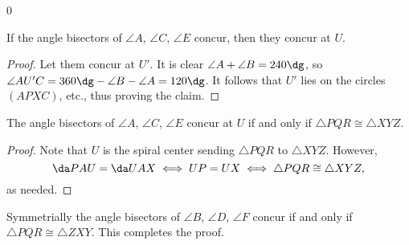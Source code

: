 \setcounter{claim}0
\begin{claim}
    If the angle bisectors of $\angle A$, $\angle C$, $\angle E$ concur, then they concur at $U$.
\end{claim}
\begin{proof}
    Let them concur at $U'$. It is clear $\angle A+\angle B=240\dg$, so $\angle AU'C=360\dg-\angle B-\angle A=120\dg$. It follows that $U'$ lies on the circles $(APXC)$, etc., thus proving the claim.
\end{proof}
\begin{claim}
    The angle bisectors of $\angle A$, $\angle C$, $\angle E$ concur at $U$ if and only if $\triangle PQR\cong\triangle XYZ$.
\end{claim}
\begin{proof}
    Note that $U$ is the spiral center sending $\triangle PQR$ to $\triangle XYZ$. However, \[\da PAU=\da UAX\iff UP=UX\iff\triangle PQR\cong\triangle XYZ,\]
    as needed.
\end{proof}

Symmetrially the angle bisectors of $\angle B$, $\angle D$, $\angle F$ concur if and only if $\triangle PQR\cong\triangle ZXY$. This completes the proof.
